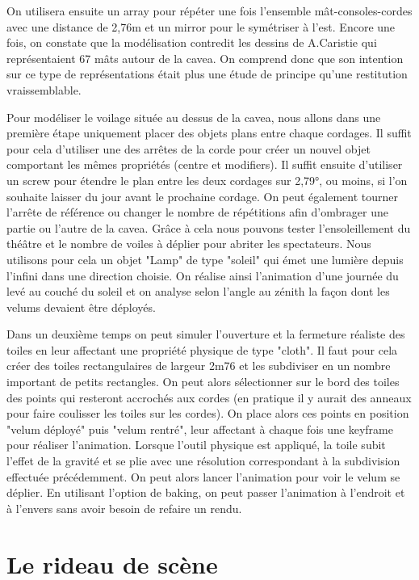 On utilisera ensuite un \gls{array} pour répéter une fois l'ensemble mât-consoles-cordes avec une distance de 2,76m et un \gls{mirror} pour le symétriser à l'est. Encore une fois, on constate que la modélisation contredit les dessins de A.Caristie qui représentaient 67 mâts autour de la \gls{cavea}. On comprend donc que son intention sur ce type de représentations était plus une étude de principe qu'une restitution vraissemblable.

Pour modéliser le voilage située au dessus de la \gls{cavea}, nous allons dans une première étape uniquement placer des objets plans entre chaque cordages. Il suffit pour cela d'utiliser une des arrêtes de la corde pour créer un nouvel objet comportant les mêmes propriétés (centre et \glspl{modifier}). Il suffit ensuite d'utiliser un \gls{screw} pour étendre le plan entre les deux cordages sur 2,79°, ou moins, si l'on souhaite laisser du jour avant le prochaine cordage. On peut également tourner l'arrête de référence ou changer le nombre de répétitions afin d'ombrager une partie ou l'autre de la \gls{cavea}. Grâce à cela nous pouvons tester l'ensoleillement du théâtre et le nombre de voiles à déplier pour abriter les spectateurs. Nous utilisons pour cela un objet "Lamp" de type "soleil" qui émet une lumière depuis l'infini dans une direction choisie. On réalise ainsi l'animation d'une journée du levé au couché du soleil et on analyse selon l'angle au zénith la façon dont les \glspl{velum} devaient être déployés.


Dans un deuxième temps on peut simuler l'ouverture et la fermeture réaliste des toiles en leur affectant une propriété physique de type "cloth". Il faut pour cela créer des toiles rectangulaires de largeur 2m76 et les subdiviser en un nombre important de petits rectangles. On peut alors sélectionner sur le bord des toiles des points qui resteront accrochés aux cordes (en pratique il y aurait des anneaux pour faire coulisser les toiles sur les cordes). On place alors ces points en position "velum déployé" puis "velum rentré", leur affectant à chaque fois une \gls{keyframe} pour réaliser l'animation. Lorsque l'outil physique est appliqué, la toile subit l'effet de la gravité et se plie avec une résolution correspondant à la subdivision effectuée précédemment. On peut alors lancer l'animation pour voir le \gls{velum} se déplier. En utilisant l'option de \gls{baking}, on peut passer l'animation à l'endroit et à l'envers sans avoir besoin de refaire un rendu.

\section{Le rideau de scène}



